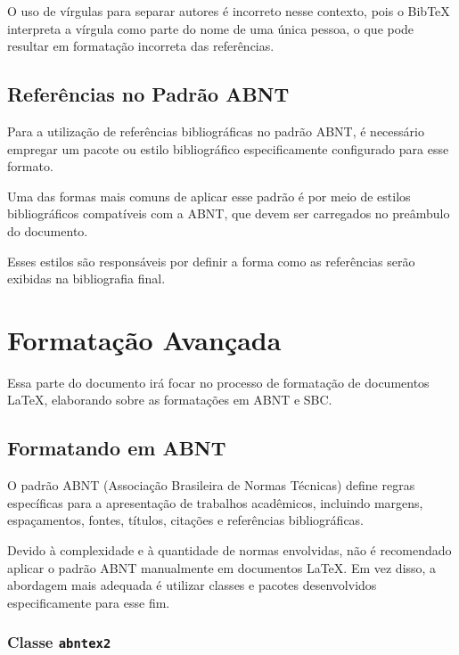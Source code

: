 \documentclass{article}
\begin{document}
O uso de vírgulas para separar autores é incorreto nesse contexto, pois o BibTeX interpreta a vírgula como parte do nome de uma única pessoa, o que pode resultar em formatação incorreta das referências.



\subsection{Referências no Padrão ABNT}

Para a utilização de referências bibliográficas no padrão ABNT, é necessário empregar um pacote ou estilo bibliográfico especificamente configurado para esse formato.

Uma das formas mais comuns de aplicar esse padrão é por meio de estilos bibliográficos compatíveis com a ABNT, que devem ser carregados no preâmbulo do documento. 

Esses estilos são responsáveis por definir a forma como as referências serão exibidas na bibliografia final.

\begin{teX}
	\usepackage[alf]{abntex2cite}
\end{teX}

\section{Formatação Avançada}

Essa parte do documento irá focar no processo de formatação de documentos \LaTeX, elaborando sobre as formatações em ABNT e SBC. 

\subsection{Formatando em ABNT}

O padrão ABNT (Associação Brasileira de Normas Técnicas) define regras específicas para a apresentação de trabalhos acadêmicos, incluindo margens, espaçamentos, fontes, títulos, citações e referências bibliográficas.

Devido à complexidade e à quantidade de normas envolvidas, não é recomendado aplicar o padrão ABNT manualmente em documentos \LaTeX. Em vez disso, a abordagem mais adequada é utilizar classes e pacotes desenvolvidos especificamente para esse fim.

\subsubsection{Classe \texttt{abntex2}}
\end{document}
